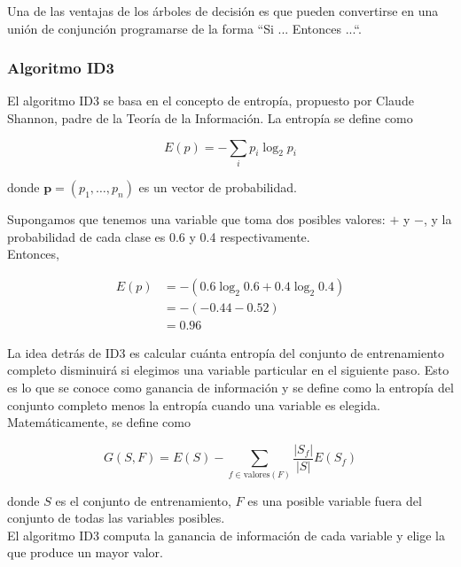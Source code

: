 Una de las ventajas de los árboles de decisión es que pueden convertirse en una unión de conjunción programarse de la forma ``Si ... Entonces ...``.

\subsubsection{Algoritmo ID3}

El algoritmo ID3 se basa en el concepto de entropía, propuesto por Claude Shannon, padre de la Teoría de la Información. La entropía se define como

\begin{equation}
E(p) = -\sum_{i} p_i \log_2 p_i
\end{equation}

donde $\mathbf{p} = (p_1, \dots, p_n)$ es un vector de probabilidad.

\begin{ejemplo}
Supongamos que tenemos una variable que toma dos posibles valores: $+$ y $-$, y la probabilidad de cada clase es 0.6 y 0.4 respectivamente.\\

Entonces,

\begin{align}
E(p) & = - (0.6 \log_2 0.6 + 0.4 \log_2 0.4) \\
     & = -(-0.44 - 0.52)\\
     & = 0.96
\end{align}
\end{ejemplo}

La idea detrás de ID3 es calcular cuánta entropía del conjunto de entrenamiento completo disminuirá si elegimos una variable particular en el siguiente paso. Esto es lo que se conoce como ganancia de información y se define como la entropía del conjunto completo menos la entropía cuando una variable es elegida. Matemáticamente, se define como

\begin{equation}
G(S, F) = E(S) - \sum_{f \in \text{valores}(F)} \dfrac{|S_f|}{|S|} E(S_f)
\end{equation}

donde $S$ es el conjunto de entrenamiento, $F$ es una posible variable fuera del conjunto de todas las variables posibles.\\

El algoritmo ID3 computa la ganancia de información de cada variable y elige la que produce un mayor valor.\\

